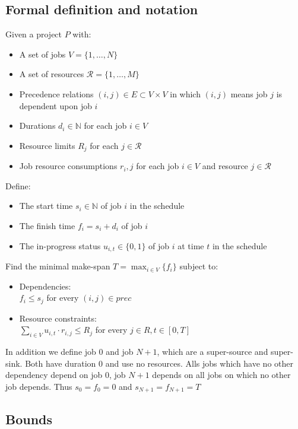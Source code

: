 \documentclass{sig-alternate}
\begin{document}
\subsection{Formal definition and notation}
Given a project $P$ with:
\begin{itemize}
\item A set of jobs $V = \{1,\ldots,N\}$ 
\item A set of resources $\mathcal{R} = \{1,\ldots,M\}$
\item Precedence relations $(i,j) \in E \subset V \times V$ in which $(i,j)$ means job $j$ is dependent upon job $i$
\item Durations $d_i \in \mathbb{N}$ for each job $i \in V$
\item Resource limits $R_j$ for each $j \in \mathcal{R}$
\item Job resource consumptions $r_i,j$ for each job $i \in V$ and resource $j \in \mathcal{R}$
\end{itemize}

Define:
\begin{itemize}
\item The start time $s_i \in \mathbb{N}$ of job $i$ in the schedule
\item The finish time $f_i = s_i + d_i$ of job $i$
\item The in-progress status $u_{i,t} \in \{0,1\}$ of job $i$ at time $t$ in the schedule
\end{itemize}

Find the minimal make-span $T = \max_{i \in V}\{f_i\}$ subject to:
\begin{itemize}
\item Dependencies: \\ $f_i \leq s_j$ for every $(i,j) \in prec$
\item Resource constraints: \\ $\sum_{i \in V}{u_{i,t} \cdot r_{i,j}} \leq R_j$ for every $j \in R, t \in [0,T]$
\end{itemize}

In addition we define job $0$ and job $N+1$, which are a super-source and super-sink.
Both have duration $0$ and use no resources.
Alls jobs which have no other dependency depend on job $0$, job $N+1$ depends on all jobs on which no other job depends.
Thus $s_0 = f_0 = 0$ and $s_{N+1} = f_{N+1} = T$

\subsection{Bounds}
\end{document}
